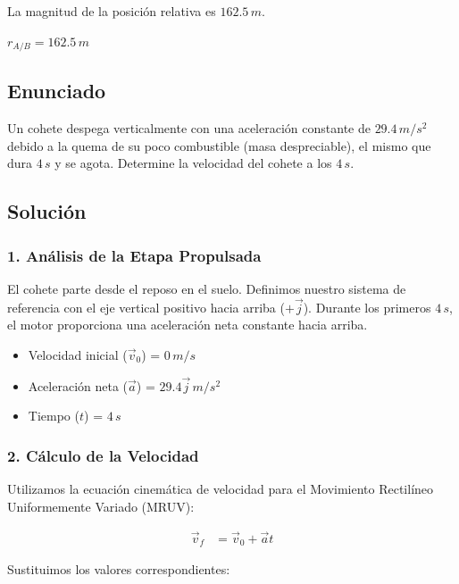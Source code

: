 \documentclass[12pt, a4paper]{article}
\begin{document}
La magnitud de la posición relativa es $162.5 \, \si{m}$.

\begin{tcolorbox}[colback=green!5!white, colframe=green!50!black, title=Respuesta Final]
\centering \Large $r_{A/B} = 162.5 \, \si{m}$
\end{tcolorbox}

\newpage

\subsection*{Enunciado}
Un cohete despega verticalmente con una aceleración constante de $29.4 \, \si{m/s^2}$ debido a la quema de su poco combustible (masa despreciable), el mismo que dura $4 \, \si{s}$ y se agota. Determine la velocidad del cohete a los $4 \, \si{s}$. 

\subsection*{Solución}

\subsubsection*{1. Análisis de la Etapa Propulsada}
El cohete parte desde el reposo en el suelo. Definimos nuestro sistema de referencia con el eje vertical positivo hacia arriba ($+\vec{j}$). Durante los primeros $4 \, \si{s}$, el motor proporciona una aceleración neta constante hacia arriba.

\begin{itemize}
\item Velocidad inicial ($\vec{v}_0$) = $0 \, \si{m/s}$
\item Aceleración neta ($\vec{a}$) = $29.4\vec{j} \, \si{m/s^2}$
\item Tiempo ($t$) = $4 \, \si{s}$
\end{itemize}

\subsubsection*{2. Cálculo de la Velocidad}
Utilizamos la ecuación cinemática de velocidad para el Movimiento Rectilíneo Uniformemente Variado (MRUV):

\begin{align*}
\vec{v}_f &= \vec{v}_0 + \vec{a}t
\end{align*}

Sustituimos los valores correspondientes:
\end{document}
